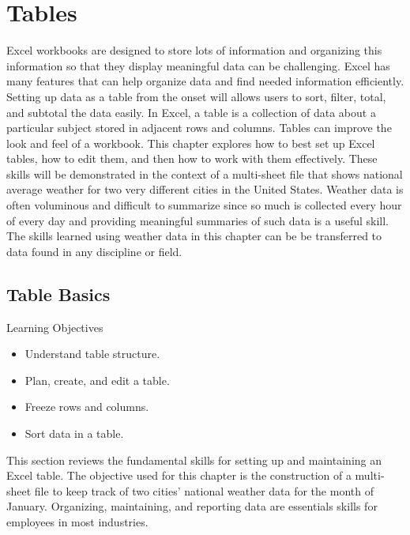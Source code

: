 \chapter{Tables}\label{ch05:tables}

Excel workbooks are designed to store lots of information and organizing this information so that they display meaningful data can be challenging. Excel has many features that can help organize data and find needed information efficiently. Setting up data as a table from the onset will allows users to sort, filter, total, and subtotal the data easily. In Excel, a table is a collection of data about a particular subject stored in adjacent rows and columns. Tables can improve the look and feel of a workbook. This chapter explores how to best set up Excel tables, how to edit them, and then how to work with them effectively. These skills will be demonstrated in the context of a multi-sheet file that shows national average weather for two very different cities in the United States. Weather data is often voluminous and difficult to summarize since so much is collected every hour of every day and providing meaningful summaries of such data is a useful skill. The skills learned using weather data in this chapter can be be transferred to data found in any discipline or field.

\section{Table Basics}

\begin{center}
	\begin{objbox}{Learning Objectives}
		\begin{itemize}
			\setlength{\itemsep}{0pt}
			\setlength{\parskip}{0pt}
			\setlength{\parsep}{0pt}
			
			\item Understand table structure.
			\item Plan, create, and edit a table.
			\item Freeze rows and columns.
			\item Sort data in a table.
		\end{itemize}
	\end{objbox}
\end{center}


This section reviews the fundamental skills for setting up and maintaining an Excel table. The
objective used for this chapter is the construction of a multi-sheet file to keep track of two cities’
national weather data for the month of January. Organizing, maintaining, and reporting data are
essentials skills for employees in most industries.

